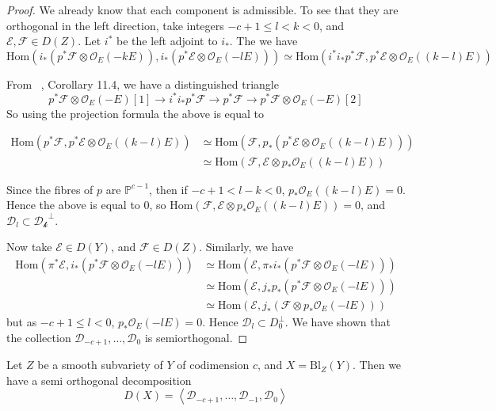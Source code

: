 \begin{proof}
We already know that each component is admissible. To see that they are orthogonal in the left direction, take integers $-c+1 \leq l <k <0$, and $\mathcal{E}, \mathcal{F}\in D(Z)$. Let $i^*$ be the left adjoint to $i_*$. The we have $$\mathrm{Hom}(i_{*}\left( p^{*}\mathcal{F}\otimes \mathcal{O}_{E}(-kE) \right), i_{*}\left( p^{*}\mathcal{E}\otimes \mathcal{O}_{E}(-lE) \right)  ) \simeq \mathrm{Hom}(i^{*}i_{*}p^{*}\mathcal{F}, p^{*}\mathcal{E}\otimes \mathcal{O}_{E}((k-l)E))$$

From ~\cite*{Huybrechts}, Corollary 11.4, we have a distinguished triangle $$p^{*}\mathcal{F}\otimes  \mathcal{O}_{E}(-E)[1]\to i^{*}i_{*}p^{*}\mathcal{F}\to p^{*}\mathcal{F}\to p^{*}\mathcal{F}\otimes \mathcal{O}_E(-E)[2]$$
So using the projection formula the above is equal to

\begin{align*}
\mathrm{Hom}(p^{*}\mathcal{F},p^{*}\mathcal{E} \otimes  \mathcal{O}_{E}((k-l)E)) &\simeq \mathrm{Hom}(\mathcal{F},p_{*}(p^{*}\mathcal{E} \otimes  \mathcal{O}_{E}((k-l)E)))  \\
&\simeq \mathrm{Hom}(\mathcal{F},\mathcal{E} \otimes p_{*} \mathcal{O}_{E}((k-l)E)) 
\end{align*}

Since the fibres of $p$ are $\mathbb{P}^{c-1}$, then if $-c+1<l-k<0$, $p_{*}\mathcal{O}_{E}((k-l)E)=0$. Hence the above is equal to 0, so $\mathrm{Hom}(\mathcal{F},\mathcal{E} \otimes p_{*} \mathcal{O}_{E}((k-l)E)) =0$, and $\mathcal{D}_{l}\subset \mathcal{D_k}^\perp$.

Now take $\mathcal{E}\in D(Y)$, and $\mathcal{F}\in D(Z)$. Similarly, we have
\begin{align*}
\mathrm{Hom}(\pi^{*}\mathcal{E},i_{*}(p^{*}\mathcal{F}\otimes \mathcal{O}_{E}(-lE))) &\simeq \mathrm{Hom}(\mathcal{E},\pi_{*}i_{*}(p^{*}\mathcal{F}\otimes \mathcal{O}_{E}(-lE))) \\
&\simeq \mathrm{Hom}(\mathcal{E},j_{*}p_{*}(p^{*}\mathcal{F}\otimes \mathcal{O}_{E}(-lE)))  \\
&\simeq \mathrm{Hom}(\mathcal{E},j_{*}(\mathcal{F}\otimes p_{*}\mathcal{O}_{E}(-lE))) 
\end{align*}
but as $-c+1\leq l<0$, $p_{*}\mathcal{O}_{E}(-lE)=0$. Hence $\mathcal{D}_{l}\subset D_{0}^\perp$. We have shown that the collection $\mathcal{D}_{-c+1},\dots,\mathcal{D}_0$ is semiorthogonal.  
\end{proof}

\begin{theorem}{}{}
    Let $Z$ be a smooth subvariety of $Y$ of codimension $c$, and $X = \mathrm{Bl}_{Z}(Y)$. Then we have a semi orthogonal decomposition $$ D(X) = \left< \mathcal{D}_{-c+1},\dots,\mathcal{D}_{-1}, \mathcal{D}_0 \right> $$
\end{theorem}

